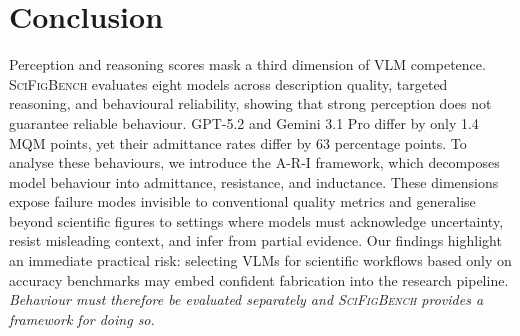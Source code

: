 \section{Conclusion}
\label{sec:conclusion}
Perception and reasoning scores mask a third dimension of VLM competence. \textsc{SciFigBench} evaluates eight models across description quality, targeted reasoning, and behavioural reliability, showing that strong perception does not guarantee reliable behaviour. GPT-5.2 and Gemini 3.1 Pro differ by only 1.4 MQM points, yet their admittance rates differ by 63 percentage points.
To analyse these behaviours, we introduce the A-R-I framework, which decomposes model behaviour into admittance, resistance, and inductance. These dimensions expose failure modes invisible to conventional quality metrics and generalise beyond scientific figures to settings where models must acknowledge uncertainty, resist misleading context, and infer from partial evidence.
Our findings highlight an immediate practical risk: selecting VLMs for scientific workflows based only on accuracy benchmarks may embed confident fabrication into the research pipeline. \textit{Behaviour must therefore be evaluated separately and \textsc{SciFigBench} provides a framework for doing so.}







